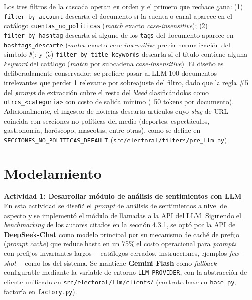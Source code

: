 Los tres filtros de la cascada operan en orden y el primero que rechace gana:
(1) \texttt{filter\_by\_account} descarta el documento si la cuenta o canal aparece
en el catálogo \texttt{cuentas\_no\_politicas} (\textit{match} exacto
\textit{case-insensitive}); (2) \texttt{filter\_by\_hashtag} descarta si alguno de
los \texttt{tags} del documento aparece en \texttt{hashtags\_descarte} (\textit{match}
exacto \textit{case-insensitive} previa normalización del símbolo \texttt{\#}); y
(3) \texttt{filter\_by\_title\_keywords} descarta si el título contiene alguna
\textit{keyword} del catálogo (\textit{match} por subcadena
\textit{case-insensitive}). El diseño es deliberadamente conservador: se prefiere
pasar al LLM 100 documentos irrelevantes que perder 1 relevante por sobreajuste
del filtro, dado que la regla \#5 del \textit{prompt} de extracción cubre el resto
del \textit{bleed} clasificándolos como \texttt{otros\_<categoria>} con costo de
salida mínimo (~50 tokens por documento). Adicionalmente, el ingestor de noticias
descarta artículos cuyo \textit{slug} de URL coincida con secciones no políticas
del medio (deportes, espectáculos, gastronomía, horóscopo, mascotas, entre otras),
como se define en \texttt{SECCIONES\_NO\_POLITICAS\_DEFAULT}
(\texttt{src/electoral/filters/pre\_llm.py}).

\section{Modelamiento}

\textbf{Actividad 1: Desarrollar módulo de análisis de sentimientos con LLM}
\\
En esta actividad se diseñó el \textit{prompt} de análisis de sentimientos a nivel
de aspecto y se implementó el módulo de llamadas a la API del LLM. Siguiendo el
\textit{benchmarking} de los autores citados en la sección 4.3.1, se optó por la
API de \textbf{DeepSeek-Chat} como modelo principal por su mecanismo de caché de
prefijo (\textit{prompt cache}) que reduce hasta en un 75\% el costo operacional
para \textit{prompts} con prefijos invariantes largos —catálogos cerrados,
instrucciones, ejemplos \textit{few-shot}— como los del sistema. Se mantiene
\textbf{Gemini Flash} como \textit{fallback} configurable mediante la variable
de entorno \texttt{LLM\_PROVIDER}, con la abstracción de cliente unificado en
\texttt{src/electoral/llm/clients/} (contrato base en \texttt{base.py}, factoría
en \texttt{factory.py}).

